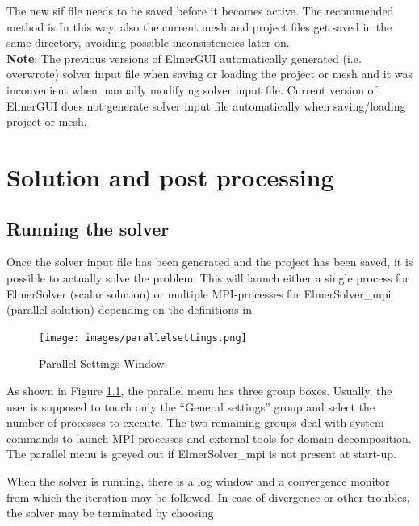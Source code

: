 \noindent The new sif file needs to be saved before it becomes active. The recommended
method is
\noindent In this way, also the current mesh and project files get saved in the
same directory, avoiding possible inconsistencies later on.
\vspace{3mm}\\
{\bf Note}: The previous versions of ElmerGUI automatically generated (i.e. overwrote) solver input file when saving or loading the project or mesh and it was inconvenient when manually modifying solver input file. Current version of ElmerGUI does not generate solver input file automatically when saving/loading project or mesh.

\chapter{Solution and post processing}

\section{Running the solver}

Once the solver input file has been generated and the project has been saved,
it is possible to actually solve the problem:
\noindent This will launch either a single process for ElmerSolver (scalar solution)
or multiple MPI-processes for ElmerSolver\_mpi (parallel solution) depending on the
definitions in


\begin{figure}[htb]
\begin{center}
 \texttt{[image: images/parallelsettings.png]}
\caption{Parallel Settings Window.}
\label{fig:parallelsettings}
\end{center}
\end{figure}

As shown in Figure \ref{fig:parallelsettings}, the parallel menu has three group boxes. Usually, the user is supposed to touch
only the ``General settings'' group and select the number of processes to execute.
The two remaining groups deal with system commands to launch MPI-processes and
external tools for domain decomposition.  The parallel menu is greyed out if
ElmerSolver\_mpi is not present at start-up.

When the solver is running, there is a log window and a convergence monitor
from which the iteration may be followed. In case of divergence or other troubles,
the solver may be terminated by choosing

